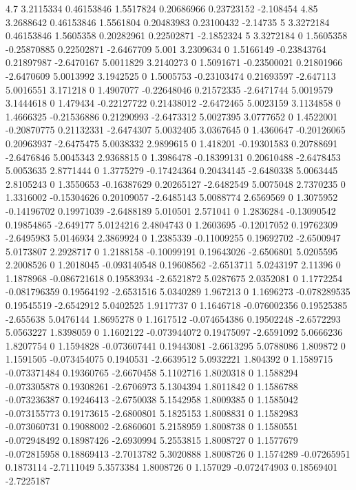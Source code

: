 \documentclass[compact]{ne630handout}
\begin{document}
{4.7 3.2115334 0.46153846 1.5517824 0.20686966 0.23723152 -2.108454
4.85 3.2688642 0.46153846 1.5561804 0.20483983 0.23100432 -2.14735
5 3.3272184 0.46153846 1.5605358 0.20282961 0.22502871 -2.1852324
5 3.3272184 0 1.5605358 -0.25870885 0.22502871 -2.6467709
5.001 3.2309634 0 1.5166149 -0.23843764 0.21897987 -2.6470167
5.0011829 3.2140273 0 1.5091671 -0.23500021 0.21801966 -2.6470609
5.0013992 3.1942525 0 1.5005753 -0.23103474 0.21693597 -2.647113
5.0016551 3.171218 0 1.4907077 -0.22648046 0.21572335 -2.6471744
5.0019579 3.1444618 0 1.479434 -0.22127722 0.21438012 -2.6472465
5.0023159 3.1134858 0 1.4666325 -0.21536886 0.21290993 -2.6473312
5.0027395 3.0777652 0 1.4522001 -0.20870775 0.21132331 -2.6474307
5.0032405 3.0367645 0 1.4360647 -0.20126065 0.20963937 -2.6475475
5.0038332 2.9899615 0 1.418201 -0.19301583 0.20788691 -2.6476846
5.0045343 2.9368815 0 1.3986478 -0.18399131 0.20610488 -2.6478453
5.0053635 2.8771444 0 1.3775279 -0.17424364 0.20434145 -2.6480338
5.0063445 2.8105243 0 1.3550653 -0.16387629 0.20265127 -2.6482549
5.0075048 2.7370235 0 1.3316002 -0.15304626 0.20109057 -2.6485143
5.0088774 2.6569569 0 1.3075952 -0.14196702 0.19971039 -2.6488189
5.010501 2.571041 0 1.2836284 -0.13090542 0.19854865 -2.649177
5.0124216 2.4804743 0 1.2603695 -0.12017052 0.19762309 -2.6495983
5.0146934 2.3869924 0 1.2385339 -0.11009255 0.19692702 -2.6500947
5.0173807 2.2928717 0 1.2188158 -0.10099191 0.19643026 -2.6506801
5.0205595 2.2008526 0 1.2018045 -0.093140548 0.19608562 -2.6513711
5.0243197 2.11396 0 1.1878968 -0.086721618 0.19583934 -2.6521872
5.0287675 2.0352081 0 1.1772254 -0.081796359 0.19564192 -2.6531516
5.0340289 1.967213 0 1.1696273 -0.078289535 0.19545519 -2.6542912
5.0402525 1.9117737 0 1.1646718 -0.076002356 0.19525385 -2.655638
5.0476144 1.8695278 0 1.1617512 -0.074654386 0.19502248 -2.6572293
5.0563227 1.8398059 0 1.1602122 -0.073944072 0.19475097 -2.6591092
5.0666236 1.8207754 0 1.1594828 -0.073607441 0.19443081 -2.6613295
5.0788086 1.809872 0 1.1591505 -0.073454075 0.1940531 -2.6639512
5.0932221 1.804392 0 1.1589715 -0.073371484 0.19360765 -2.6670458
5.1102716 1.8020318 0 1.1588294 -0.073305878 0.19308261 -2.6706973
5.1304394 1.8011842 0 1.1586788 -0.073236387 0.19246413 -2.6750038
5.1542958 1.8009385 0 1.1585042 -0.073155773 0.19173615 -2.6800801
5.1825153 1.8008831 0 1.1582983 -0.073060731 0.19088002 -2.6860601
5.2158959 1.8008738 0 1.1580551 -0.072948492 0.18987426 -2.6930994
5.2553815 1.8008727 0 1.1577679 -0.072815958 0.18869413 -2.7013782
5.3020888 1.8008726 0 1.1574289 -0.07265951 0.1873114 -2.7111049
5.3573384 1.8008726 0 1.157029 -0.072474903 0.18569401 -2.7225187
}
\end{document}
